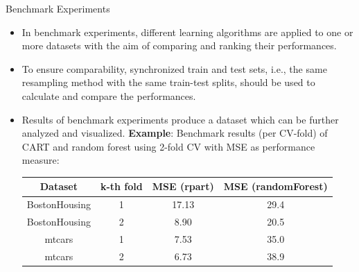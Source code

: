 







\begin{vbframe}{Benchmark Experiments}

\begin{itemize}
\item In benchmark experiments, different learning algorithms are applied to one or more datasets with the aim of comparing and ranking their performances.
\item To ensure comparability, synchronized train and test sets, i.e., the same resampling method with the same train-test splits, should be used to calculate and compare the performances.
\item Results of benchmark experiments produce a dataset which can be further analyzed and visualized. 
\newline
\textbf{Example}: Benchmark results (per CV-fold) of CART and random forest using 2-fold CV with MSE as performance measure:

\vspace{0.2cm}
\footnotesize

\begin{center}
\begin{tabular}{c|c|c|c}
\hline
Dataset & k-th fold & MSE (rpart) & MSE (randomForest)\\
\hline
BostonHousing & 1 & 17.13 & 29.4\\
\hline
BostonHousing & 2 & 8.90 & 20.5\\
\hline
mtcars & 1 & 7.53 & 35.0\\
\hline
mtcars & 2 & 6.73 & 38.9
\end{tabular}
\end{center}
\end{itemize}
\framebreak

\end{vbframe}

\normalsize

